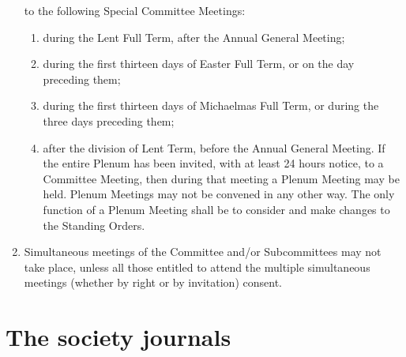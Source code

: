 \documentclass{article}
\begin{document}
\begin{enumerate}
to the following Special Committee Meetings:
  \begin{enumerate}
  \item during the Lent Full Term, after the Annual General Meeting;
  \item during the first thirteen days of Easter Full Term, or on the day
  preceding them;
  \item during the first thirteen days of Michaelmas Full Term, or during the
  three days preceding them;
  \item after the division of Lent Term, before the Annual General Meeting.
  If the entire Plenum has been invited, with at least 24 hours notice, to a
  Committee Meeting, then during that meeting a Plenum Meeting may be
  held. Plenum Meetings may not be convened in any other way. The only
  function of a Plenum Meeting shall be to consider and make changes to
  the Standing Orders.
  \end{enumerate}
\item Simultaneous meetings of the Committee and/or Subcommittees may not
take place, unless all those entitled to attend the multiple simultaneous
meetings (whether by right or by invitation) consent.
\end{enumerate}


\section{The society journals}
\label{societyjournals}
\end{document}
